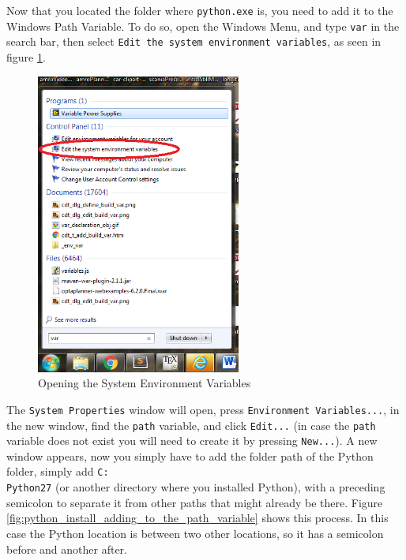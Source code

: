 Now that you located the folder where \texttt{python.exe} is, you need to add it to the Windows Path Variable. To do so, open the Windows Menu, and type \texttt{var} in the search bar, then select \texttt{Edit the system environment variables}, as seen in figure \ref{fig:python_install_opening_environment_variables}.


\begin{figure}[h!]
  \centering
    \includegraphics[width=0.6\textwidth]{python_install_4}
    \caption{Opening the System Environment Variables \label{fig:python_install_opening_environment_variables} }
\end{figure}

The \texttt{System Properties} window will open, press \texttt{Environment Variables...}, in the new window, find the \texttt{path} variable, and click \texttt{Edit...} (in case the \texttt{path} variable does not exist you will need to create it by pressing \texttt{New...}). A new window appears, now you simply have to add the folder path of the Python folder, simply add \texttt{C:\\Python27} (or another directory where you installed Python), with a preceding semicolon to separate it from other paths that might already be there. Figure \ref{fig:python_install_adding_to_the_path_variable} shows this process. In this case the Python location is between two other locations, so it has a semicolon before and another after.

